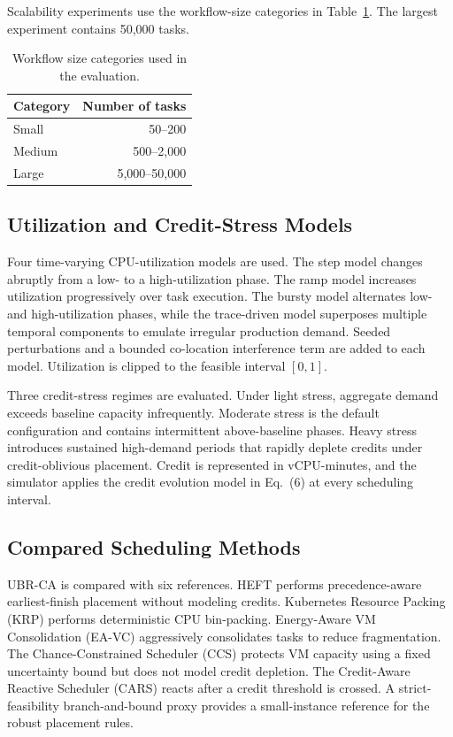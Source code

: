 Scalability experiments use the workflow-size categories in
Table~\ref{tab:workflow-sizes}. The largest experiment contains 50,000
tasks.

\begin{table}[t]
\centering
\caption{Workflow size categories used in the evaluation.}
\label{tab:workflow-sizes}
\begin{tabular}{lr}
\toprule
Category & Number of tasks \\
\midrule
Small  & 50--200 \\
Medium & 500--2,000 \\
Large  & 5,000--50,000 \\
\bottomrule
\end{tabular}
\end{table}

\subsection{Utilization and Credit-Stress Models}
\label{subsec:workload-models}

Four time-varying CPU-utilization models are used. The step model
changes abruptly from a low- to a high-utilization phase. The ramp
model increases utilization progressively over task execution. The
bursty model alternates low- and high-utilization phases, while the
trace-driven model superposes multiple temporal components to emulate
irregular production demand. Seeded perturbations and a bounded
co-location interference term are added to each model. Utilization is
clipped to the feasible interval $[0,1]$.

Three credit-stress regimes are evaluated. Under light stress,
aggregate demand exceeds baseline capacity infrequently. Moderate
stress is the default configuration and contains intermittent
above-baseline phases. Heavy stress introduces sustained high-demand
periods that rapidly deplete credits under credit-oblivious placement.
Credit is represented in vCPU-minutes, and the simulator applies the
credit evolution model in Eq.~(6) at every scheduling interval.

\subsection{Compared Scheduling Methods}
\label{subsec:baselines}

UBR-CA is compared with six references. HEFT performs
precedence-aware earliest-finish placement without modeling credits.
Kubernetes Resource Packing (KRP) performs deterministic CPU
bin-packing. Energy-Aware VM Consolidation (EA-VC) aggressively
consolidates tasks to reduce fragmentation. The Chance-Constrained
Scheduler (CCS) protects VM capacity using a fixed uncertainty bound
but does not model credit depletion. The Credit-Aware Reactive
Scheduler (CARS) reacts after a credit threshold is crossed. A
strict-feasibility branch-and-bound proxy provides a small-instance
reference for the robust placement rules.

